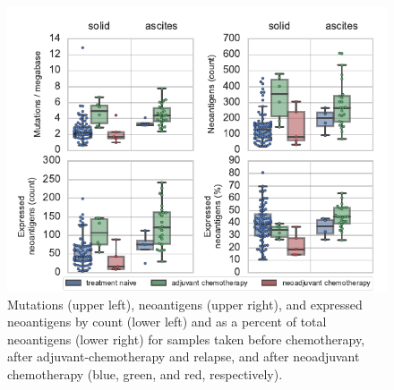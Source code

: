 \begin{figure}
\centering
\includegraphics[scale=1.0]{figures/counts.pdf}
\caption{Mutations (upper left), neoantigens (upper right), and expressed neoantigens by count (lower left) and as a percent of total neoantigens (lower right) for samples taken before chemotherapy, after adjuvant-chemotherapy and relapse, and after neoadjuvant chemotherapy (blue, green, and red, respectively).}
\label{fig:counts}
\end{figure}


